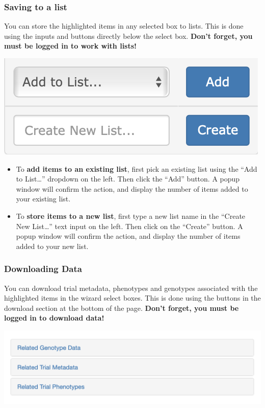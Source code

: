 \documentclass[
  12pt,
]{book}
\begin{document}
\hypertarget{saving-to-a-list}{%
\subsubsection*{Saving to a list}\label{saving-to-a-list}}


You can store the highlighted items in any selected box to lists. This is done using the inputs and buttons directly below the select box. \textbf{Don't forget, you must be logged in to work with lists!}

\begin{center}\includegraphics[width=0.5\linewidth]{assets/images/add_create_list} \end{center}

\begin{itemize}
\item
  To \textbf{add items to an existing list}, first pick an existing list using the ``Add to List\ldots{}'' dropdown on the left. Then click the ``Add'' button. A popup window will confirm the action, and display the number of items added to your existing list.
\item
  To \textbf{store items to a new list}, first type a new list name in the ``Create New List\ldots{}'' text input on the left. Then click on the ``Create'' button. A popup window will confirm the action, and display the number of items added to your new list.
\end{itemize}

\hypertarget{downloading-data}{%
\subsubsection*{Downloading Data}\label{downloading-data}}


You can download trial metadata, phenotypes and genotypes associated with the highlighted items in the wizard select boxes. This is done using the buttons in the download section at the bottom of the page. \textbf{Don't forget, you must be logged in to download data!}

\begin{center}\includegraphics[width=0.75\linewidth]{assets/images/wizard_download_options} \end{center}
\end{document}
